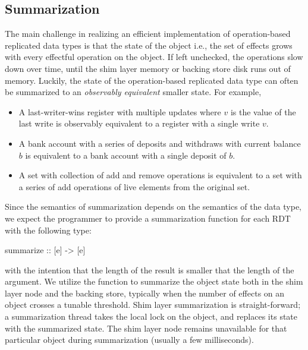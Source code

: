 \subsection{Summarization}

The main challenge in realizing an efficient implementation of operation-based
replicated data types is that the state of the object i.e., the set of effects
grows with every effectful operation on the object. If left unchecked, the
operations slow down over time, until the shim layer memory or backing store
disk runs out of memory. Luckily, the state of the operation-based replicated
data type can often be summarized to an \emph{observably equivalent} smaller
state. For example,

\begin{itemize}
\setlength{\itemsep}{2pt}
\item A last-writer-wins register with multiple updates where $v$ is the value
of the last write is observably equivalent to a register with a single write
$v$.

\item A bank account with a series of deposits and withdraws with current
balance $b$ is equivalent to a bank account with a single deposit of $b$.

\item A set with collection of add and remove operations is equivalent to a set
with a series of add operations of live elements from the original set.
\end{itemize}

Since the semantics of summarization depends on the semantics of the data type,
we expect the programmer to provide a summarization function for each RDT with
the following type:

\begin{codehaskell}
summarize :: [e] -> [e]
\end{codehaskell}

\noindent with the intention that the length of the result is smaller that the
length of the argument. We utilize the  function to summarize the
object state both in the shim layer node and the backing store, typically when
the number of effects on an object crosses a tunable threshold. Shim layer
summarization is straight-forward; a summarization thread takes the local lock
on the object, and replaces its state with the summarized state. The shim layer
node remains unavailable for that particular object during summarization
(usually a few milliseconds).

